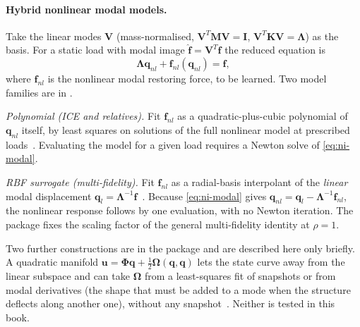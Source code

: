 
\paragraph{Hybrid nonlinear modal models.}
Take the linear modes $\bm V$ (mass-normalised, $\bm V^T\bm M\bm V=\bm I$, $\bm V^T\bm K\bm V=\bm\Lambda$) as the basis. For a static load with modal image $\hat{\bm f}=\bm V^T\bm f$ the reduced equation is
\begin{equation}\label{eq:ni-modal}
\bm\Lambda\bm q_{nl}+\bm f_{nl}(\bm q_{nl})=\hat{\bm f},
\end{equation}
where $\bm f_{nl}$ is the nonlinear modal restoring force, to be learned. Two model families are in \rom{}.

\emph{Polynomial (ICE and relatives).} Fit $\bm f_{nl}$ as a quadratic-plus-cubic polynomial of $\bm q_{nl}$ itself, by least squares on solutions of the full nonlinear model at prescribed loads~\cite{hollkamp2008ice,mignolet2013review}. Evaluating the model for a given load requires a Newton solve of \eqref{eq:ni-modal}.

\emph{RBF surrogate (multi-fidelity).} Fit $\bm f_{nl}$ as a radial-basis interpolant of the \emph{linear} modal displacement $\bm q_l=\bm\Lambda^{-1}\hat{\bm f}$~\cite{he2023mfsnlrom}. Because \eqref{eq:ni-modal} gives $\bm q_{nl}=\bm q_l-\bm\Lambda^{-1}\bm f_{nl}$, the nonlinear response follows by one evaluation, with no Newton iteration. The package fixes the scaling factor of the general multi-fidelity identity at $\rho=1$.

Two further constructions are in the package and are described here only briefly. A quadratic manifold $\bm u=\bm\Phi\bm q+\tfrac12\bm\Omega(\bm q,\bm q)$ lets the state curve away from the linear subspace and can take $\bm\Omega$ from a least-squares fit of snapshots or from modal derivatives (the shape that must be added to a mode when the structure deflects along another one), without any snapshot~\cite{jain2017qm}. Neither is tested in this book.

